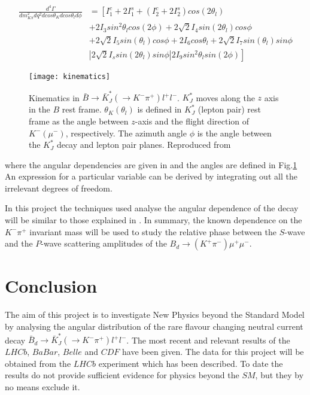 \documentclass[a4paper,12pt]{article}
\begin{document}
\begin{equation}
\begin{split}
\frac{d^4\Gamma}{dm^2_{K\pi}dq^2d cos\theta_K d cos \theta_l d\phi}& =\left [I^c_1 + 2 I^s_1 + \left ( I^c_2 + 2 I_2^s\right ) cos (2\theta_l) \right . \\
&\left . + 2 I_3 sin^2\theta_l cos(2\phi) + 2\sqrt{2} I_4 sin(2\theta_l) cos\phi \right. \\
&+\left .  2\sqrt{2} I_5 sin(\theta_l) cos\phi + 2I_6 cos\theta_l  + 2\sqrt{2}I_7 sin(\theta_l) sin\phi\right. \\
& \left . |2\sqrt{2} I_s sin(2\theta_l) sin\phi | 2I_9 sin^2\theta_l sin(2\phi)\right ] 
\end{split}
\end{equation}

\begin{figure}
\texttt{[image: kinematics]}
\caption{Kinematics in $\bar B\rightarrow\bar K^{\ast}_J (\rightarrow K^-\pi^+)l^+l^-$. $K_J^{\ast}$ moves along the $z$ axis in the $B$ rest frame. $\theta_K(\theta_l)$ is defined in $K^{\ast}_J$ (lepton pair) rest frame as the angle between $z$-axis and the flight direction of $K^-(\mu^-)$, respectively. The azimuth angle $\phi$ is the angle between the $K^{\ast}_J$ decay and lepton pair planes. Reproduced from \cite{paper3}}
\label{figure2}
\end{figure}
where the angular dependencies are given in \cite{paper3} and the angles are defined in Fig.\ref{figure2}
An expression for a particular variable  can be derived by integrating out all the irrelevant degrees of freedom.

In this project the techniques used analyse the angular dependence of the decay will be similar to those explained in \cite{paper2}. In summary, the known dependence on the $K^-\pi^+$ invariant mass will be used to study the relative phase between the $S$-wave and the $P$-wave scattering amplitudes of the $B_d\rightarrow (K^+\pi^{-})\mu^+\mu^-$. 

\section{Conclusion}
The aim of this project is to investigate New Physics beyond the Standard Model by analysing the angular distribution of the rare flavour changing neutral current decay 
$\bar B_d\rightarrow\bar K^{\ast}_J (\rightarrow K^-\pi^+)l^+l^-$. 
The most recent and relevant results of the $LHCb$, $BaBar$, $Belle$ and $CDF$ have been given. The data for this project will be obtained from the $LHCb$ experiment which has been described. To date the results do not provide sufficient evidence for physics beyond the $SM$, but they by no means exclude it. 

\nocite{paper7,paper9}


\end{document}

